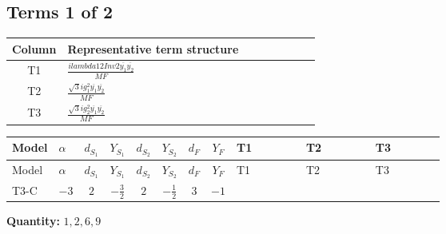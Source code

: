 \documentclass[8pt]{article}
\begin{document}
\begin{landscape}
\subsection*{Terms 1 of 2}
\begin{center}
\begin{tabular}{@{}c >{\raggedright\arraybackslash}p{0.82\linewidth}@{}}
\toprule
Column & Representative term structure \\
\midrule
T1 & \(\displaystyle \frac{i lambda12Inv2 \overline{y_{1}} \overline{y_{2}}}{MF}\) \\
\midrule
T2 & \(\displaystyle \frac{\sqrt{3} i g_{1}^{2} \overline{y_{1}} \overline{y_{2}}}{MF}\) \\
\midrule
T3 & \(\displaystyle \frac{\sqrt{3} i g_{2}^{2} \overline{y_{1}} \overline{y_{2}}}{MF}\) \\
\midrule
\bottomrule
\end{tabular}
\end{center}
\smallskip
\tiny
\begin{longtable}{@{}llcccccc >{\raggedright\arraybackslash}p{0.21\linewidth} >{\raggedright\arraybackslash}p{0.21\linewidth} >{\raggedright\arraybackslash}p{0.21\linewidth}@{}}
\toprule
Model & $\alpha$ & $d_{S_1}$ & $Y_{S_1}$ & $d_{S_2}$ & $Y_{S_2}$ & $d_F$ & $Y_F$ & T1 & T2 & T3 \\
\midrule
\endfirsthead
\toprule
Model & $\alpha$ & $d_{S_1}$ & $Y_{S_1}$ & $d_{S_2}$ & $Y_{S_2}$ & $d_F$ & $Y_F$ & T1 & T2 & T3 \\
\midrule
\endhead
T3-C & $-3$ & $2$ & $-\frac{3}{2}$ & $2$ & $-\frac{1}{2}$ & $3$ & $-1$ & \scriptsize\adjustbox{max width=\linewidth}{$\begin{gathered} \frac{i lambda12Inv2 \overline{y_{1}} \overline{y_{2}}}{6 MF}\end{gathered}$} & \scriptsize\adjustbox{max width=\linewidth}{$\begin{gathered} \frac{\sqrt{3} i g_{1}^{2} \overline{y_{1}} \overline{y_{2}}}{4 MF}\end{gathered}$} & \scriptsize\adjustbox{max width=\linewidth}{$\begin{gathered} \frac{\sqrt{3} i g_{2}^{2} \overline{y_{1}} \overline{y_{2}}}{8 MF}\end{gathered}$} \\
\midrule
\bottomrule
\end{longtable}
\clearpage
\noindent\textbf{Quantity: }$\mathrm{1,2,6,9}$\par\smallskip

\end{landscape}
\end{document}
